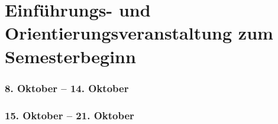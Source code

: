 \section*{Einführungs- und Orientierungsveranstaltung zum Semesterbeginn}

\subsubsection*{8. Oktober -- 14. Oktober}

\begin{savenotes}

\begin{centering}

\end{centering}

\subsubsection*{15. Oktober -- 21. Oktober}

\begin{centering}

\end{centering}

\end{savenotes}
